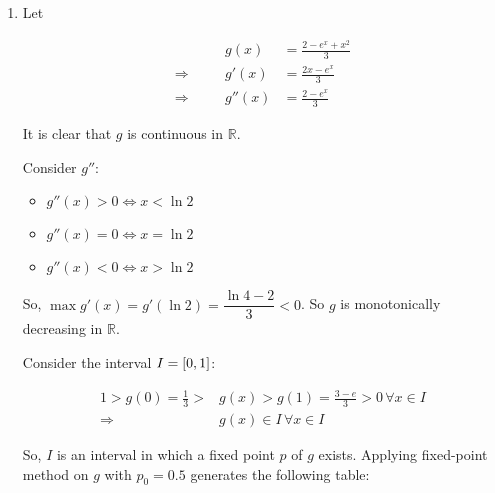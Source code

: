 \documentclass[../../../../Assignments]{subfiles}
\begin{document}
\begin{solution}
    \begin{enumerate}[label = \alph*)]
        \item Let

            \begin{align*}
                &\quad&         g(x) &= \frac{2 - e^x + x^2}{3} \\
                \Rightarrow&&  g'(x) &= \frac{2x - e^x}{3} \\
                \Rightarrow&& g''(x) &= \frac{2 - e^x}{3}
            \end{align*}

            It is clear that \(g\) is continuous in \(\mathbb{R}\).

            Consider \(g''\):

            \begin{itemize}
                \item \(g''(x) > 0 \iff x < \ln{2}\)
                \item \(g''(x) = 0 \iff x = \ln{2}\)
                \item \(g''(x) < 0 \iff x > \ln{2}\)
            \end{itemize}

            So, \(\max g'(x) = g'(\ln{2}) = \dfrac{\ln{4} - 2}{3} < 0\). So \(g\)
            is monotonically decreasing in \(\mathbb{R}\).

            Consider the interval \(I = \interval{0}{1}\):

            \[\]
            \begin{align*}
                1 > g(0) = \frac{1}{3} > &g(x) > g(1) = \frac{3 - e}{3} > 0 \, \forall x \in I \\
                             \Rightarrow &g(x) \in I \, \forall x \in I
            \end{align*}

            So, \(I\) is an interval in which a fixed point \(p\) of \(g\)
            exists. Applying fixed-point method on \(g\) with \(p_0 =
            \num{0.5}\) generates the following table:


\end{enumerate}
\end{solution}
\end{document}
